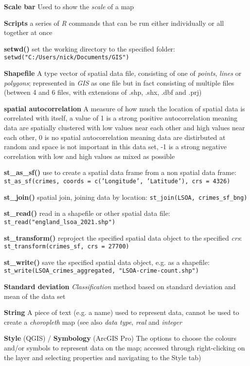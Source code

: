 \documentclass[a4paper,10pt]{article}
\begin{document}
\begin{multicols}{2}
\textbf{Scale bar} Used to show the \textit{scale} of a map

\textbf{Scripts} a series of \textit{R} commands that can be run either individually or all together at once

\textbf{setwd()} set the working directory to the specified folder: \texttt{setwd("C:/Users/nick/Documents/GIS")}

\textbf{Shapefile} A type vector of spatial data file, consisting of one of \textit{points}, \textit{lines} or \textit{polygons}; represented in \textit{GIS} as one file but in fact consisting of multiple files (between 4 and 6 files, with extensions of .shp, .shx, .dbf and .prj)

\textbf{spatial autocorrelation} A measure of how much the location of spatial data is correlated with itself, a value of 1 is a strong positive autocorrelation meaning data are spatially clustered with low values near each other and high values near each other, 0 is no spatial autocorrelation meaning data are distirbuted at random and space is not important in this data set, -1 is a strong negative correlation with low and high values as mixed as possible

\textbf{st\_as\_sf()} use to create a spatial data frame from a non spatial data frame: \texttt{st\_as\_sf(crimes, coords = c('Longitude', 'Latitude'), crs = 4326)}

\textbf{st\_join()} spatial join, joining data by location: \texttt{st\_join(LSOA, crimes\_sf\_bng)}

\textbf{st\_read()} read in a shapefile or other spatial data file: \texttt{st\_read("england\_lsoa\_2021.shp")}

\textbf{st\_transform()} reproject the specified spatial data object to the specified \textit{crs}: \texttt{st\_transform(crimes\_sf, crs = 27700)}

\textbf{st\_write()} save the specified spatial data object, e.g. as a shapefile:  \texttt{st\_write(LSOA\_crimes\_aggregated, "LSOA-crime-count.shp")}

\textbf{Standard deviation} \textit{Classification} method based on standard deviation and mean of the data set  

\textbf{String} A piece of text (e.g. a name) used to represent data, cannot be used to create a \textit{choropleth} map (see also \textit{data type}, \textit{real} and \textit{integer} 

\textbf{Style} (QGIS) / \textbf{Symbology} (ArcGIS Pro) The options to choose the colours and/or symbols to represent data on the map; accessed through right-clicking on the layer and selecting properties and navigating to the Style tab)


\end{multicols}
\end{document}
